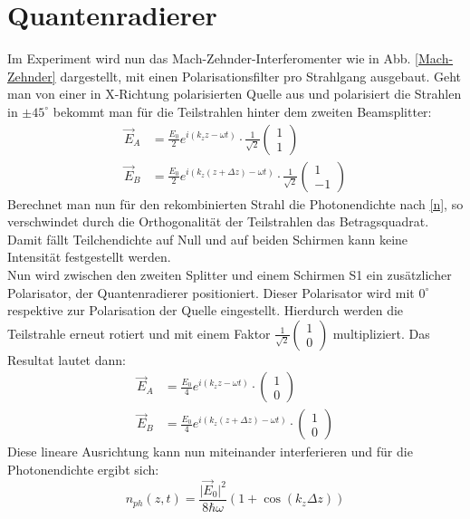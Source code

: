 \documentclass{include/thesisclass3}
\begin{document}
\section{Quantenradierer}
Im Experiment wird nun das Mach-Zehnder-Interferomenter wie in Abb. \ref{Mach-Zehnder} dargestellt, mit einen Polarisationsfilter pro Strahlgang ausgebaut. Geht man von einer in X-Richtung polarisierten Quelle aus und polarisiert die Strahlen in $\pm 45^\circ$ bekommt man für die Teilstrahlen hinter dem zweiten Beamsplitter:
\begin{align}
\vec{E}_A&=\frac{E_0}{2}e^{i(k_z z - \omega t)} \cdot\frac{1}{\sqrt{2}}\left(\begin{array}{c} 1 \\ 1 \end{array}\right)\\
\vec{E}_B&=\frac{E_0}{2}e^{i(k_z (z+\Delta z) - \omega t)}\cdot \frac{1}{\sqrt{2}}\left(\begin{array}{c} 1 \\ -1 \end{array}\right)
\end{align}
Berechnet man nun für den rekombinierten Strahl die Photonendichte nach \ref{n}, so verschwindet durch die Orthogonalität der Teilstrahlen das Betragsquadrat. Damit fällt Teilchendichte auf Null und auf beiden Schirmen kann keine Intensität festgestellt werden.\\
Nun wird zwischen den zweiten Splitter und einem Schirmen S1 ein zusätzlicher Polarisator, der Quantenradierer positioniert. Dieser Polarisator wird mit $0^\circ$ respektive zur Polarisation der Quelle eingestellt. Hierdurch werden die Teilstrahle erneut rotiert und mit einem Faktor $\frac{1}{\sqrt{2}}\left(\begin{array}{c} 1 \\ 0 \end{array}\right)$ multipliziert. Das Resultat lautet dann:
\begin{align}
\vec{E}_A&=\frac{E_0}{4}e^{i(k_z z - \omega t)} \cdot\left(\begin{array}{c} 1 \\ 0 \end{array}\right)\\
\vec{E}_B&=\frac{E_0}{4}e^{i(k_z (z+\Delta z) - \omega t)}\cdot \left(\begin{array}{c} 1 \\ 0 \end{array}\right)
\end{align}
Diese lineare Ausrichtung kann nun miteinander interferieren und für die Photonendichte ergibt sich:
\begin{equation}
n_{ph}(z,t)=\frac{\vert \vec{E}_0\vert ^2}{8\hbar\omega}(1+\cos(k_z\Delta z))
\end{equation}
\end{document}

